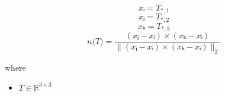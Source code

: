 \documentclass[12pt]{article}
\begin{document}
\[
\textit{xᵢ} = \textit{T}_{*, 1}
\]
\[
\textit{xⱼ} = \textit{T}_{*, 2}
\]
\[
\textit{xₖ} = \textit{T}_{*, 3}
\]
\[
\textit{n(T)} = \frac{(\textit{xⱼ} - \textit{xᵢ}) × (\textit{xₖ} - \textit{xᵢ})}{\|(\textit{xⱼ} - \textit{xᵢ}) × (\textit{xₖ} - \textit{xᵢ})\|_2}
\]

where
\begin{itemize}
\item $\textit{T} \in \mathbb{R}^{ 3 \times 3 }$
\end{itemize}
\end{document}
